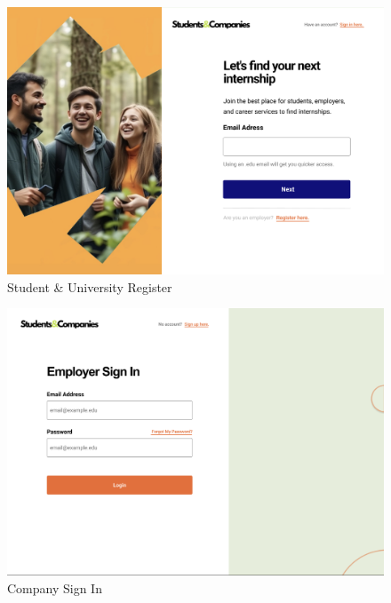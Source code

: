 \documentclass{article}
\begin{document}
\begin{figure}[H]
    \centering
    \includegraphics[scale = 0.40]{figures/UserInterfaces/Student Register.png}
    \caption{Student \& University Register}
     \centering
\end{figure}

\begin{figure}[H]
    \centering
    \includegraphics[scale = 0.40]{figures/UserInterfaces/Employer Sign In.png}
    \caption{Company Sign In}
     \centering
\end{figure}
\end{document}
